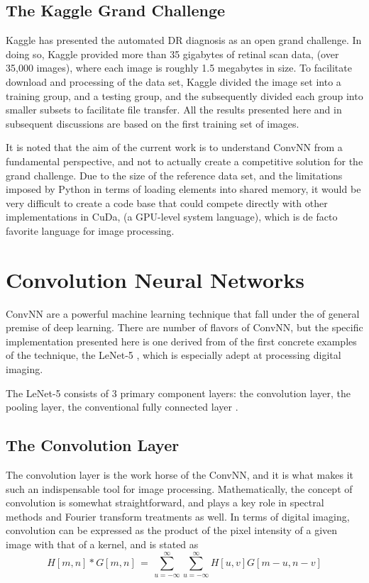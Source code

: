 \documentclass[letterpaper,12pt]{article}
\begin{document}
\subsection{The Kaggle Grand Challenge}

Kaggle has presented the automated DR diagnosis as an open grand challenge. In doing so, Kaggle provided more than 35 gigabytes of retinal scan data, (over 35,000 images), where each image is roughly 1.5 megabytes in size. To facilitate download and processing of the data set, Kaggle divided the image set into a training group, and a testing group, and the subsequently divided each group into smaller subsets to facilitate file transfer. All the results presented here and in subsequent discussions are based on the first training set of images.

It is noted that the aim of the current work is to understand ConvNN from a fundamental perspective, and not to actually create a competitive solution for the grand challenge. Due to the size of the reference data set, and the limitations imposed by Python in terms of loading elements into shared memory, it would be very difficult to create a code base that could compete directly with other implementations in CuDa, (a GPU-level system language), which is de facto favorite language for image processing.	

\section{Convolution Neural Networks}

ConvNN are a powerful machine learning technique that fall under the of general premise of deep learning. There are number of flavors of ConvNN, but the specific implementation presented here is one derived from of the first concrete examples of the technique, the LeNet-5 \cite{LeNet}, which is especially adept at processing digital imaging.

The LeNet-5 consists of 3 primary component layers: the convolution layer, the pooling layer, the conventional fully connected layer \cite{deep}. 

\subsection{The Convolution Layer}

The convolution layer is the work horse of the ConvNN, and it is what makes it such an indispensable tool for image processing. Mathematically, the concept of convolution is somewhat straightforward, and plays a key role in spectral methods and Fourier transform treatments as well. In terms of digital imaging, convolution can be expressed as \cite{deep} the product of the pixel intensity of a given image with that of a kernel, and is stated as
\begin{equation}
H[m,n] * G[m,n] \, = \, \sum_{u=- \infty}^{\infty} \sum_{u=- \infty}^{\infty} H[u,v] G[m-u, n-v]
\end{equation}
\end{document}
